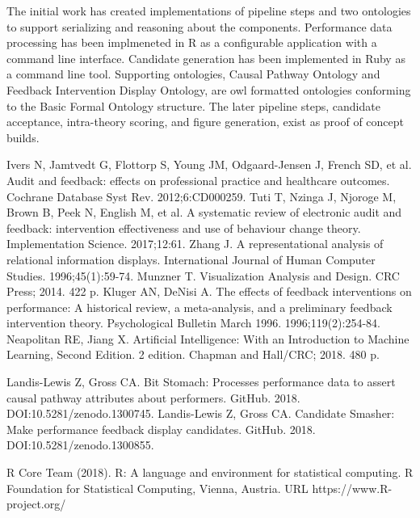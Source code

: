 \documentclass{amia}
\begin{document}
The initial work has created implementations of pipeline steps and two ontologies to support serializing and reasoning about the components.
Performance data processing has been implmeneted in R\cite{rcoreteam2018} as a configurable application\cite{bitstomach2018} with a command line interface.
Candidate generation has been implemented in Ruby as a command line tool\cite{cansmash2018}.
Supporting ontologies, Causal Pathway Ontology and Feedback Intervention Display Ontology, are owl formatted ontologies conforming to the Basic Formal Ontology structure.
The later pipeline steps, candidate acceptance, intra-theory scoring, and figure generation, exist as proof of concept builds.

\makeatletter
\renewcommand{\@biblabel}[1]{\hfill #1.}
\makeatother


\begin{thebibliography}{1}
\setlength\itemsep{-0.1em}

Ivers N, Jamtvedt G, Flottorp S, Young JM, Odgaard-Jensen J, French SD, et al. Audit and feedback: effects on professional practice and healthcare outcomes. Cochrane Database Syst Rev. 2012;6:CD000259. 
Tuti T, Nzinga J, Njoroge M, Brown B, Peek N, English M, et al. A systematic review of electronic audit and feedback: intervention effectiveness and use of behaviour change theory. Implementation Science. 2017;12:61.
Zhang J. A representational analysis of relational information displays. International Journal of Human Computer Studies. 1996;45(1):59-74.
Munzner T. Visualization Analysis and Design. CRC Press; 2014. 422 p. 
Kluger AN, DeNisi A. The effects of feedback interventions on performance: A historical review, a meta-analysis, and a preliminary feedback intervention theory. Psychological Bulletin March 1996. 1996;119(2):254-84.
Neapolitan RE, Jiang X. Artificial Intelligence: With an Introduction to Machine Learning, Second Edition. 2 edition. Chapman and Hall/CRC; 2018. 480 p. 

Landis-Lewis Z, Gross CA. Bit Stomach: Processes performance data to assert causal pathway attributes about performers. GitHub. 2018. DOI:10.5281/zenodo.1300745.
Landis-Lewis Z, Gross CA. Candidate Smasher: Make performance feedback display candidates. GitHub. 2018. DOI:10.5281/zenodo.1300855.

R Core Team (2018). R: A language and environment for statistical computing. R Foundation for Statistical Computing, Vienna, Austria. URL https://www.R-project.org/

\end{thebibliography}
\end{document}
